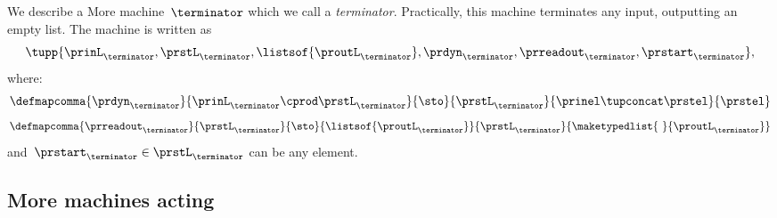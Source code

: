 \begin{example}[Terminator]
    We describe a More machine~$\terminator$ which we call a \emph{terminator}.
    Practically, this machine terminates any input, outputting an empty list.
    The machine is written as
    \begin{equation}
        \tupp{\prinL_{\terminator},\prstL_{\terminator},\listsof{\proutL_{\terminator}},\prdyn_{\terminator},\prreadout_{\terminator},\prstart_{\terminator}},
    \end{equation}
    where:
    \begin{equation}
        \defmapcomma{\prdyn_\terminator}
        {\prinL_\terminator \cprod \prstL_\terminator}
        {\sto}
        {\prstL_\terminator}
        {\prinel \tupconcat \prstel}
        {\prstel}
    \end{equation}
    \begin{equation}
        \defmapcomma{\prreadout_\terminator}
        {\prstL_\terminator}
        {\sto}
        {\listsof{\proutL_\terminator}}
        {\prstL_\terminator}
        {
            \maketypedlist{ \ }{\proutL_\terminator}
        }
    \end{equation}
    and~$\prstart_\terminator \in \prstL_\terminator$ can be any element.
\end{example}

\subsection{More machines acting}

